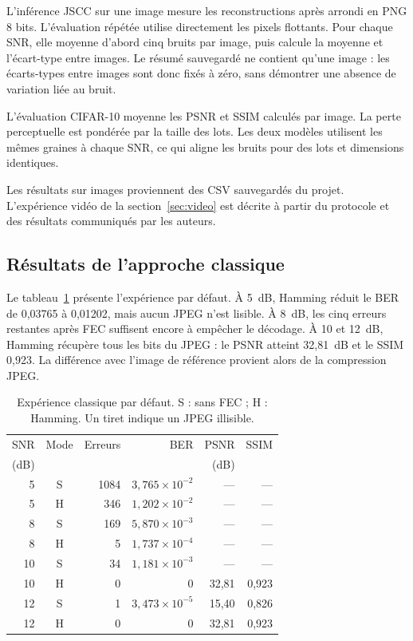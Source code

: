 \documentclass[conference]{IEEEtran}
\begin{document}
L'inférence JSCC sur une image mesure les reconstructions après
arrondi en PNG 8 bits. L'évaluation répétée utilise directement les
pixels flottants. Pour chaque SNR, elle moyenne d'abord cinq bruits
par image, puis calcule la moyenne et l'écart-type entre images.
Le résumé sauvegardé ne contient qu'une image : les écarts-types
entre images sont donc fixés à zéro, sans démontrer une absence
de variation liée au bruit.

L'évaluation CIFAR-10 moyenne les PSNR et SSIM calculés par image.
La perte perceptuelle est pondérée par la taille des lots. Les deux
modèles utilisent les mêmes graines à chaque SNR, ce qui aligne les
bruits pour des lots et dimensions identiques.

Les résultats sur images proviennent des CSV sauvegardés du projet.
L'expérience vidéo de la section~\ref{sec:video} est décrite à partir
du protocole et des résultats communiqués par les auteurs.

\subsection{Résultats de l'approche classique}
Le tableau~\ref{tab:classical} présente l'expérience par défaut.
À 5~dB, Hamming réduit le BER de 0,03765 à 0,01202, mais aucun
JPEG n'est lisible. À 8~dB, les cinq erreurs restantes après FEC
suffisent encore à empêcher le décodage. À 10 et 12~dB, Hamming
récupère tous les bits du JPEG : le PSNR atteint 32,81~dB et le
SSIM 0,923. La différence avec l'image de référence provient alors
de la compression JPEG.

\begin{table}[!t]
\centering
\caption{Expérience classique par défaut. S : sans FEC ; H : Hamming.
Un tiret indique un JPEG illisible.}
\label{tab:classical}
\setlength{\tabcolsep}{3pt}
\begin{tabular}{rcrrrr}
\toprule
SNR & Mode & Erreurs & BER & PSNR & SSIM \\
(dB) & & & & (dB) & \\
\midrule
5 & S & 1084 & $3{,}765\!\times\!10^{-2}$ & --- & --- \\
5 & H & 346 & $1{,}202\!\times\!10^{-2}$ & --- & --- \\
8 & S & 169 & $5{,}870\!\times\!10^{-3}$ & --- & --- \\
8 & H & 5 & $1{,}737\!\times\!10^{-4}$ & --- & --- \\
10 & S & 34 & $1{,}181\!\times\!10^{-3}$ & --- & --- \\
10 & H & 0 & 0 & 32,81 & 0,923 \\
12 & S & 1 & $3{,}473\!\times\!10^{-5}$ & 15,40 & 0,826 \\
12 & H & 0 & 0 & 32,81 & 0,923 \\
\bottomrule
\end{tabular}
\end{table}
\end{document}
